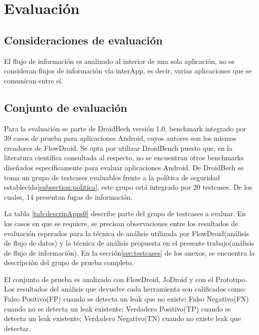 \label{ch:evaluacion}
\chapter{Evaluación}

\section{Consideraciones de evaluación}
El flujo de información es analizado al interior de una sola aplicación, no se
consideran flujos de información vía interApp, es decir, varias aplicaciones que
se comunican entre sí.

\section{Conjunto de evaluación}
\label{sec:evalSet}
Para la evaluación se parte de DroidBech versión 1.0\cite{DroidBenchBenchmarks},
benchmark integrado por 39 casos de prueba para aplicaciones Android, cuyos
autores son los mismos creadores de FlowDroid. Se opta por utilizar DroidBench
puesto que, en la literatura científica consultada al respecto, no se encuentran
otros benchmarks diseñados específicamente para evaluar aplicaciones Android.\newline 
De DroidBech se toma un grupo de testcases evaluables frente a la política de
seguridad establecida\ref{subsection:politica}, este grupo está integrado por 20
testcases. De los cuales, 14 presentan fugas de información.

La tabla \ref{tab:descripApps0} describe parte del grupo de testcases a
evaluar. En los casos en que se requiere, se precisan observaciones entre los
resultados de evaluación esperados para la técnica de análisis utilizada por
FlowDroid(análisis de flujo de datos) y la técnica de análisis propuesta en el
presente trabajo(análisis de flujo de información).
En la sección\ref{sec:testcases} de los anexos, se encuentra la
descripción del grupo de prueba completo.

El conjunto de prueba es analizado con FlowDroid, JoDroid y con el Prototipo. Los
resultados del análisis que devuelve cada herramienta son calificados como:
Falso Positivo(FP) cuando se detecta un leak que no existe; Falso Negativo(FN)
cuando no se detecta un leak existente; Verdadero Positivo(TP) cuando se detecta
un leak existente; Verdadero Negativo(TN) cuando no existe leak que detectar.

